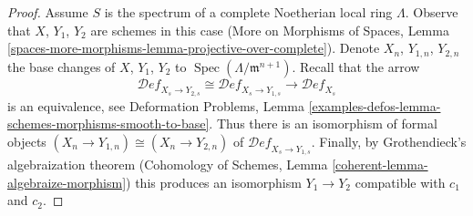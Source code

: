 \documentclass[10pt,a4paper]{amsart}
\theoremstyle{plain}
\theoremstyle{definition}
\theoremstyle{remark}
\numberwithin{equation}{subsection}
\def\Spec{\mathop{\mathrm{Spec}}}
\def\Deformationcategory{\mathcal{D}\!\mathit{ef}}
\begin{document}
\begin{proof}
\medskip\noindent
Assume $S$ is the spectrum of a complete Noetherian local ring $\Lambda$.
Observe that $X$, $Y_1$, $Y_2$ are schemes in this case
(More on Morphisms of Spaces, Lemma
\ref{spaces-more-morphisms-lemma-projective-over-complete}).
Denote $X_n$, $Y_{1, n}$, $Y_{2, n}$ the base changes of
$X$, $Y_1$, $Y_2$ to $\Spec(\Lambda/\mathfrak m^{n + 1})$.
Recall that the arrow
$$
\Deformationcategory_{X_s \to Y_{2, s}} \cong
\Deformationcategory_{X_s \to Y_{1, s}} \longrightarrow
\Deformationcategory_{X_s}
$$
is an equivalence, see Deformation Problems, Lemma
\ref{examples-defos-lemma-schemes-morphisms-smooth-to-base}.
Thus there is an isomorphism of formal objects
$(X_n \to Y_{1, n}) \cong (X_n \to Y_{2, n})$
of $\Deformationcategory_{X_s \to Y_{1, s}}$.
Finally, by Grothendieck's algebraization theorem
(Cohomology of Schemes, Lemma \ref{coherent-lemma-algebraize-morphism})
this produces an isomorphism $Y_1 \to Y_2$ compatible with $c_1$ and $c_2$.
\end{proof}
\end{document}
